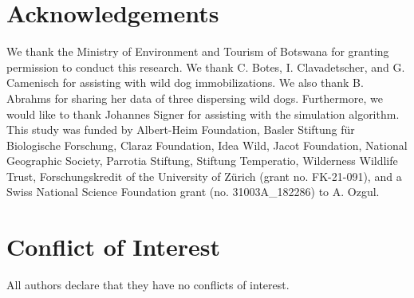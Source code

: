 \documentclass[abstract=on,10pt,a4paper,bibliography=totocnumbered]{article}
\begin{document}
\section{Acknowledgements}
We thank the Ministry of Environment and Tourism of Botswana for granting
permission to conduct this research. We thank C. Botes, I. Clavadetscher, and G.
Camenisch for assisting with wild dog immobilizations. We also thank B. Abrahms
for sharing her data of three dispersing wild dogs. Furthermore, we would like
to thank Johannes Signer for assisting with the simulation algorithm. This study
was funded by Albert-Heim Foundation, Basler Stiftung für Biologische Forschung,
Claraz Foundation, Idea Wild, Jacot Foundation, National Geographic Society,
Parrotia Stiftung, Stiftung Temperatio, Wilderness Wildlife Trust,
Forschungskredit of the University of Zürich (grant no. FK-21-091), and a Swiss
National Science Foundation grant (no. 31003A\_182286) to A. Ozgul.

\section{Conflict of Interest}
All authors declare that they have no conflicts of interest.

\newpage
\begingroup
\singlespacing

\endgroup
\end{document}
